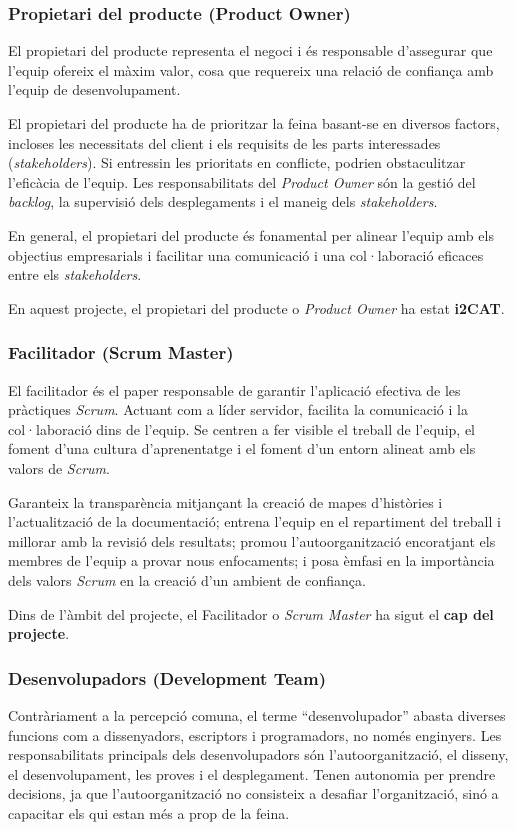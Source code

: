 \subsubsection{Propietari del producte (Product Owner)}
El propietari del producte representa el negoci i és responsable d'assegurar que l'equip ofereix el màxim valor, cosa que requereix una relació de confiança amb l'equip de desenvolupament.

El propietari del producte ha de prioritzar la feina basant-se en diversos factors, incloses les necessitats del client i els requisits de les parts interessades (\textit{stakeholders}). Si entressin les prioritats en conflicte, podrien obstaculitzar l'eficàcia de l'equip. Les responsabilitats del \textit{Product Owner} són la gestió del \textit{backlog}, la supervisió dels desplegaments i el maneig dels \textit{stakeholders}.

En general, el propietari del producte és fonamental per alinear l'equip amb els objectius empresarials i facilitar una comunicació i una col·laboració eficaces entre els \textit{stakeholders}.

En aquest projecte, el propietari del producte o \textit{Product Owner} ha estat \textbf{i2CAT}.


\subsubsection{Facilitador (Scrum Master)}
El facilitador és el paper responsable de garantir l'aplicació efectiva de les pràctiques \textit{Scrum}. Actuant com a líder servidor, facilita la comunicació i la col·laboració dins de l'equip. Se centren a fer visible el treball de l'equip, el foment d'una cultura d'aprenentatge i el foment d'un entorn alineat amb els valors de \textit{Scrum}.

Garanteix la transparència mitjançant la creació de mapes d'històries i l'actualització de la documentació; entrena l'equip en el repartiment del treball i millorar amb la revisió dels resultats; promou l'autoorganització encoratjant els membres de l'equip a provar nous enfocaments; i posa èmfasi en la importància dels valors \textit{Scrum} en la creació d'un ambient de confiança.

Dins de l'àmbit del projecte, el Facilitador o \textit{Scrum Master} ha sigut el \textbf{cap del projecte}.


\subsubsection{Desenvolupadors (Development Team)}
Contràriament a la percepció comuna, el terme ``desenvolupador'' abasta diverses funcions com a dissenyadors, escriptors i programadors, no només enginyers. Les responsabilitats principals dels desenvolupadors són l'autoorganització, el disseny, el desenvolupament, les proves i el desplegament. Tenen autonomia per prendre decisions, ja que l'autoorganització no consisteix a desafiar l'organització, sinó a capacitar els qui estan més a prop de la feina. 

